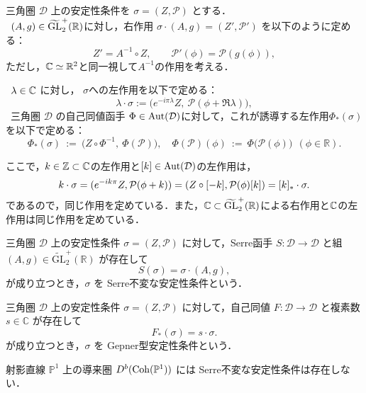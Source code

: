 \begin{defn}
三角圏 $\mathcal{D}$ 上の安定性条件を $\sigma=(Z,\mathcal{P})$ とする．\\
\bullet \ $(A,g)\in\tildeGL^+_2(\RR)$に対し，右作用 $\sigma\cdot(A,g)=(Z',\mathcal{P}')$ を以下のように定める：
\[
	Z' = A^{-1}\circ Z,\qquad 
\mathcal{P}'(\phi)=\mathcal{P}(g(\phi)),
\]
ただし，$\CC \simeq \RR^2$と同一視して$A^{-1}$の作用を考える．

\bullet \ $\lambda\in \CC$ に対し， $\sigma$への左作用を以下で定める：
\[
\lambda\cdot\sigma := \bigl(e^{-i\pi\lambda}Z,\ \mathcal{P}(\phi+\Re \lambda)\bigr),
\]
\bullet\ 三角圏 $\mathcal{D}$ の自己同値函手 $\Phi\in \Aut(\mathcal{D})$に対して，これが誘導する左作用$\Phi_\ast(\sigma)$を以下で定める：
\[
\Phi_*(\sigma)\ :=\ \bigl(Z\circ \Phi^{-1},\ \Phi(\mathcal{P})\bigr),\quad
\Phi(\mathcal{P})(\phi)\ :=\ \Phi\bigl(\mathcal{P}(\phi)\bigr)\ \ (\phi\in\mathbb{R}).
\]
\end{defn}
ここで，$k\in\ZZ \subset \CC$の左作用と$[k]\in\Aut(\D)$の左作用は，
\begin{equation*}
	k\cdot \sigma = (e^{-ik\pi}Z, \P(\phi + k)) =  (Z\circ [-k], \P(\phi)[k]) = [k]_\ast\cdot \sigma .
\end{equation*}
であるので，同じ作用を定めている．また，$\CC\subset\tildeGL^+_2(\RR)$による右作用と$\CC$の左作用は同じ作用を定めている．

\begin{defn}\cite{Kuz03}
三角圏 $\mathcal{D}$ 上の安定性条件 $\sigma=(Z,\mathcal{P})$ に対して，Serre函手 $S:\mathcal{D}\to\mathcal{D}$ と組 $(A,g)\in \widetilde{\mathrm{GL}}^+_2(\mathbb{R})$ が存在して
\[
S(\sigma)=\sigma \cdot (A,g),
\]
が成り立つとき，$\sigma$ を Serre不変な安定性条件という．

\end{defn}

\begin{defn}
三角圏 $\mathcal{D}$ 上の安定性条件 $\sigma=(Z,\mathcal{P})$ に対して，自己同値 $F:\mathcal{D}\to\mathcal{D}$ と複素数 $s\in\mathbb{C}$ が存在して
\[
	F_*(\sigma)=s\cdot \sigma.
\]
が成り立つとき，$\sigma$ を Gepner型安定性条件という．
\end{defn}

\begin{thm}
	射影直線 \(\mathbb{P}^1\) 上の導来圏 \(D^b(\Coh(\PP^1))\) には Serre不変な安定性条件は存在しない．
\end{thm}
